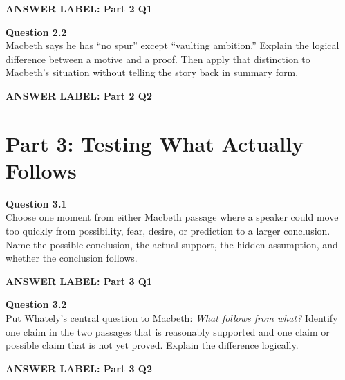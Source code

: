 \documentclass[12pt]{article}
\newcommand{\answerbox}[2]{%
\vspace{0.12em}
\noindent\textbf{#1}\par
\vspace{0.04em}
\noindent\fbox{%
\begin{minipage}[t][#2]{\dimexpr\textwidth-2\fboxsep-2\fboxrule}
\rule{\textwidth}{0pt}
\vspace{#2}
\end{minipage}}
\par\vspace{0.22em}}
\begin{document}
\answerbox{ANSWER LABEL: Part 2 Q1}{2.45in}

\textbf{Question 2.2}\\[-0.15em]
Macbeth says he has ``no spur'' except ``vaulting ambition.'' Explain the logical difference between a motive and a proof. Then apply that distinction to Macbeth's situation without telling the story back in summary form.

\answerbox{ANSWER LABEL: Part 2 Q2}{2.35in}

\newpage

\section*{Part 3: Testing What Actually Follows}

\textbf{Question 3.1}\\[-0.15em]
Choose one moment from either Macbeth passage where a speaker could move too quickly from possibility, fear, desire, or prediction to a larger conclusion. Name the possible conclusion, the actual support, the hidden assumption, and whether the conclusion follows.

\answerbox{ANSWER LABEL: Part 3 Q1}{2.55in}

\textbf{Question 3.2}\\[-0.15em]
Put Whately's central question to Macbeth: \textit{What follows from what?} Identify one claim in the two passages that is reasonably supported and one claim or possible claim that is not yet proved. Explain the difference logically.

\answerbox{ANSWER LABEL: Part 3 Q2}{2.45in}
\end{document}
